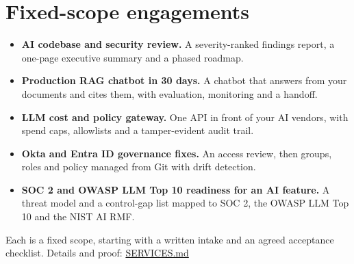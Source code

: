 \documentclass[10pt,letterpaper]{article}
\newcommand{\szmeta}{\fontsize{8pt}{10pt}\selectfont}
\begin{document}
\section*{Fixed-scope engagements}\begin{itemize}
\item \textbf{AI codebase and security review.} A severity-ranked findings report, a one-page executive summary and a phased roadmap.
\item \textbf{Production RAG chatbot in 30 days.} A chatbot that answers from your documents and cites them, with evaluation, monitoring and a handoff.
\item \textbf{LLM cost and policy gateway.} One API in front of your AI vendors, with spend caps, allowlists and a tamper-evident audit trail.
\item \textbf{Okta and Entra ID governance fixes.} An access review, then groups, roles and policy managed from Git with drift detection.
\item \textbf{SOC 2 and OWASP LLM Top 10 readiness for an AI feature.} A threat model and a control-gap list mapped to SOC 2, the OWASP LLM Top 10 and the NIST AI RMF.
\end{itemize}
{\szmeta Each is a fixed scope, starting with a written intake and an agreed acceptance checklist. Details and proof: \href{https://github.com/adammatthewsteinberger/resume/blob/HEAD/SERVICES.md}{SERVICES.md}}\par
\end{document}
